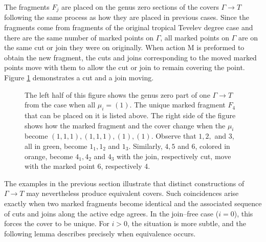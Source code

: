 \documentclass[11pt,reqno]{amsart}
\newcommand{\inputTikZ}[2]{%
     \resizebox{#1}{!}{}}
\theoremstyle{definition}
\begin{document}
The fragments $F_j$ are placed on the genus zero sections of the covers $\Gamma \to T$ following the same process as how they are placed in previous cases. Since the fragments come from fragments of the original tropical Tevelev degree case and there are the same number of marked points on $\Gamma$, all marked points on $\Gamma$ are on the same cut or join they were on originally. When action M is preformed to obtain the new fragment, the cuts and joins corresponding to the moved marked points move with them to allow the cut or join to remain covering the point. Figure \ref{fig:cutsandjoinsmovingex} demonstrates a cut and a join moving.


\begin{figure}[tb]
    \centering
    \inputTikZ{.7\textwidth}{Figures/cutsandjoinsmovingex}
    \caption{The left half of this figure shows the genus zero part of one $\Gamma\to T$ from the case when all $\mu_i=(1)$. The unique marked fragment $F_4$ that can be placed on it is listed above. The right side of the figure shows how the marked fragment and the cover change when the $\mu_i$ become $(1,1,1),(1,1,1),(1),(1)$. Observe that $1,2,$ and $3$, all in green, become $1_1,1_2$ and $1_3$. Similarly, $4,5$ and $6$, colored in orange, become $4_1,4_2$ and $4_3$ with the join, respectively cut, move with the marked point 6, respectively 4.}
    \label{fig:cutsandjoinsmovingex}
\end{figure}

The examples in the previous section illustrate that distinct constructions of 
$\Gamma \to T$ may nevertheless produce equivalent covers. Such coincidences 
arise exactly when two marked fragments become identical and the associated 
sequence of cuts and joins along the active edge agrees. In the join–free case 
($i=0$), this forces the cover to be unique. For $i>0$, the situation is more 
subtle, and the following lemma describes precisely when equivalence occurs. 
\end{document}
